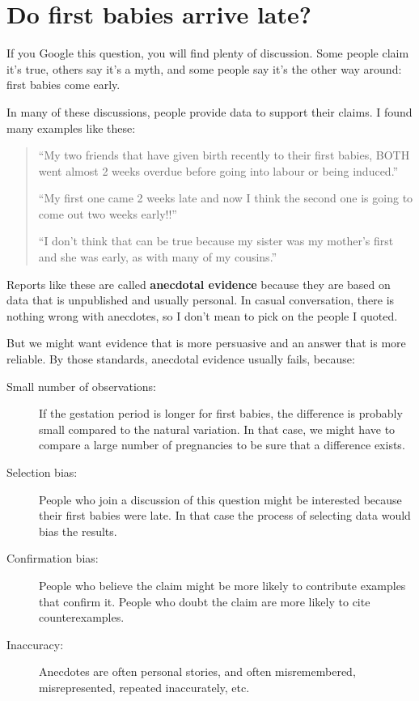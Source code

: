 \documentclass[12pt]{book}
\begin{document}
\section{Do first babies arrive late?}

If you Google this question, you will find plenty of discussion.
Some people claim it's true, others say it's a myth, and some people
say it's the other way around: first babies come early.

In many of these discussions, people provide data to support their
claims.  I found many examples like these:

\begin{quote}

``My two friends that have given birth recently to their first babies,
BOTH went almost 2 weeks overdue before going into labour or being
induced.''

``My first one came 2 weeks late and now I think the second one is
going to come out two weeks early!!''

``I don't think that can be true because my sister was my mother's
first and she was early, as with many of my cousins.''

\end{quote}

Reports like these are called {\bf anecdotal evidence} because they
are based on data that is unpublished and usually personal.  In casual
conversation, there is nothing wrong with anecdotes, so I don't mean
to pick on the people I quoted.

But we might want evidence that is more persuasive and
an answer that is more reliable.  By those standards, anecdotal
evidence usually fails, because:

\begin{description}

\item[Small number of observations:] If the gestation period is longer
  for first babies, the difference is probably small compared to the
  natural variation.  In that case, we might have to compare a large
  number of pregnancies to be sure that a difference exists.

\item[Selection bias:] People who join a discussion of this question
  might be interested because their first babies were late.  In that
  case the process of selecting data would bias the results.

\item[Confirmation bias:] People who believe the claim might be more
  likely to contribute examples that confirm it.  People who doubt the
  claim are more likely to cite counterexamples.

\item[Inaccuracy:] Anecdotes are often personal stories, and often
  misremembered, misrepresented, repeated
  inaccurately, etc.

\end{description}
\end{document}
